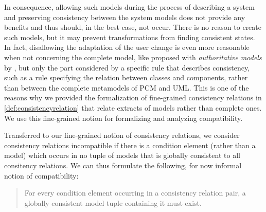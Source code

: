 In consequence, allowing such models during the process of describing a system and preserving consistency between the system models does not provide any benefits and thus should, in the best case, not occur.
There is no reason to create such models, but it may prevent transformations from finding consistent states.
In fact, disallowing the adaptation of the user change is even more reasonable when not concerning the complete model, like proposed with \emph{authoritative models} by \textcite{stevens2020BidirectionalTransformationLarge-SoSym}, but only the part considered by a specific rule that describes consistency, such as a rule specifying the relation between classes and components, rather than between the complete metamodels of \gls{PCM} and UML.
This is one of the reasons why we provided the formalization of fine-grained consistency relations in \autoref{def:consistencyrelation} that relate extracts of models rather than complete ones.
We use this fine-grained notion for formalizing and analyzing compatibility.

Transferred to our fine-grained notion of consistency relations, we consider consistency relations incompatible if there is a condition element (rather than a model) which occurs in no tuple of models that is globally consistent to all consitency relations.
We can thus formulate the following, for now informal notion of compatibility:
\begin{quote}
    For every condition element occurring in a consistency relation pair, a globally consistent model tuple containing it must exist.
\end{quote}

